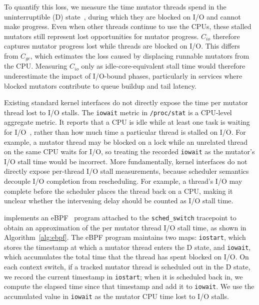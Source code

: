 To quantify this loss, we measure the time mutator threads spend in the uninterruptible (D) state~\cite{kernel:sleeping}, during which they are blocked on I/O and cannot make progress.
Even when other threads continue to use the CPUs, these stalled mutators still represent lost opportunities for mutator progress.
$C_\mathit{io}$ therefore captures mutator progress lost while threads are blocked on I/O.
This differs from $C_\mathit{gc}$, which estimates the loss caused by \flexheapGC{} displacing runnable mutators from the CPU.
Measuring $C_\mathit{io}$ only as idle-core-equivalent stall time would therefore underestimate the impact of I/O-bound phases, particularly in services where blocked mutators contribute to queue buildup and tail latency.


Existing standard kernel interfaces do not directly expose the time per mutator thread lost to I/O stalls.
The \texttt{iowait} metric in \texttt{/proc/stat} is a CPU-level aggregate metric.
It reports that a CPU is idle while at least one task is waiting for I/O~\cite{linux:iowait}, rather than how much time a particular thread is stalled on I/O.
For example, a mutator thread may be blocked on a lock while an unrelated thread on the same CPU waits for I/O, so treating the recorded \texttt{iowait} as the mutator's I/O stall time would be incorrect.
More fundamentally, kernel interfaces do not directly expose per-thread I/O stall measurements, because scheduler semantics decouple I/O completion from rescheduling.
For example, a thread's I/O may complete before the scheduler places the thread back on a CPU, making it unclear whether the intervening delay should be counted as I/O stall time.

\flexheapName{} implements an eBPF~\cite{ebpf} program attached to the \texttt{sched\_switch} tracepoint to obtain an approximation of the per mutator thread I/O stall time, as shown in Algorithm~\ref{alg:ebpf}.
The eBPF program maintains two maps: \texttt{iostart}, which stores the timestamp at which a mutator thread enters the D state, and \texttt{iowait}, which accumulates the total time that the thread has spent blocked on I/O.
On each context switch, if a tracked mutator thread is scheduled out in the D state, we record the current timestamp in \texttt{iostart}; when it is scheduled back in, we compute the elapsed time since that timestamp and add it to \texttt{iowait}.
We use the accumulated value in \texttt{iowait} as the mutator CPU time lost to I/O stalls.

